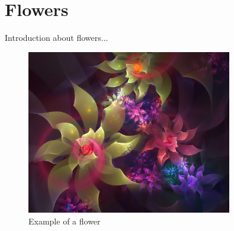 \documentclass[a4paper,12pt]{article}
\begin{document}
\section{Flowers}

Introduction about flowers...

\begin{figure}[H]
\centering
\includegraphics[width=0.8\textwidth]{Flowers.jpg}
\caption{Example of a flower}
\end{figure}
\end{document}
